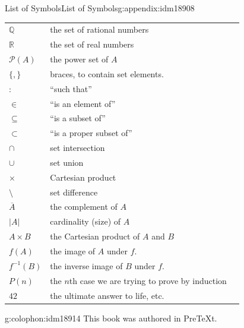 \documentclass[oneside,10pt,]{book}
\numberwithin{equation}{chapter}
\def\Q{\mathbb Q}
\def\R{\mathbb R}
\def\pow{\mathcal P}
\def\inv{^{-1}}
\def\st{:}
\newcommand{\card}[1]{\left| #1 \right|}
\begin{document}
\begin{appendixptx}{List of Symbols}{}{List of Symbols}{}{}{g:appendix:idm18908}
\begin{longtable}[l]{lp{}r}
\(\Q\)&the set of rational numbers&\pageref{g:notation:idm13347}\\
\(\R\)&the set of real numbers&\pageref{g:notation:idm13358}\\
\(\pow(A)\)&the power set of \(A\)&\pageref{g:notation:idm13370}\\
\(\{, \}\)&braces, to contain set elements.&\pageref{g:notation:idm13384}\\
\(\st\)&``such that''&\pageref{g:notation:idm13395}\\
\(\in\)&``is an element of''&\pageref{g:notation:idm13406}\\
\(\subseteq\)&``is a subset of''&\pageref{g:notation:idm13427}\\
\( \subset\)&``is a proper subset of''&\pageref{g:notation:idm13442}\\
\(\cap\)&set intersection&\pageref{g:notation:idm13456}\\
\(\cup\)&set union&\pageref{g:notation:idm13471}\\
\(\times\)&Cartesian product&\pageref{g:notation:idm13487}\\
\(\setminus\)&set difference&\pageref{g:notation:idm13500}\\
\(\overline{A}\)&the complement of \(A\)&\pageref{g:notation:idm13510}\\
\(\card{A}\)&cardinality (size) of \(A\)&\pageref{g:notation:idm13521}\\
\(A\times B\)&the Cartesian product of \(A\) and \(B\)&\pageref{g:notation:idm13903}\\
\(f(A)\)&the image of \(A\) under \(f\).&\pageref{g:notation:idm14688}\\
\(f\inv(B)\)&the inverse image of \(B\) under \(f\).&\pageref{g:notation:idm14703}\\
\(P(n)\)&the \(n\)th case we are trying to prove by induction&\pageref{g:notation:idm17675}\\
\(42\)&the ultimate answer to life, etc.&\pageref{g:notation:idm17712}\\
\end{longtable}
\end{appendixptx}
%
\backmatter
%
%
\renewcommand{\leftmark}{Index}
\printindex
%
\cleardoublepage
\pagestyle{empty}
\begin{backcolophon}{g:colophon:idm18914}%
This book was authored in PreTeXt.%
\end{backcolophon}%
\end{document}

